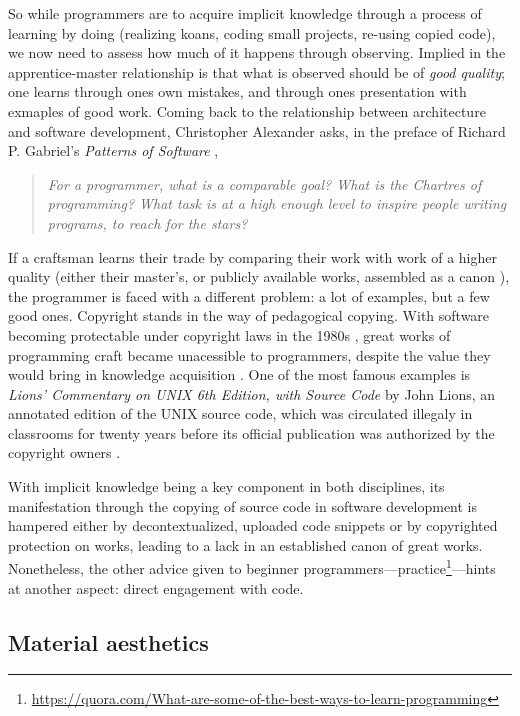So while programmers are to acquire implicit knowledge through a process of learning by doing (realizing koans, coding small projects, re-using copied code), we now need to assess how much of it happens through observing. Implied in the apprentice-master relationship is that what is observed should be of \textit{good quality}; one learns through ones own mistakes, and through ones presentation with exmaples of good work. Coming back to the relationship between architecture and software development, Christopher Alexander asks, in the preface of Richard P. Gabriel's \textit{Patterns of Software} \citep{gabriel_patterns_1998},

\begin{quote}
  \textit{For a programmer, what is a comparable goal? What is the Chartres of programming? What task is at a high enough level to inspire people writing programs, to reach for the stars?}
\end{quote}

If a craftsman learns their trade by comparing their work with work of a higher quality (either their master's, or publicly available works, assembled as a canon \citep{taylor_patterns_2001}), the programmer is faced with a different problem: a lot of examples, but a few good ones.  Copyright stands in the way of pedagogical copying. With software becoming protectable under copyright laws in the 1980s \citep{oman_computer_2018}, great works of programming craft became unacessible to programmers, despite the value they would bring in knowledge acquisition \citep{gabriel_mob_2001}. One of the most famous examples is \emph{Lions' Commentary on UNIX 6th Edition, with Source Code} by John Lions, an annotated edition of the UNIX source code, which was circulated illegaly in classrooms for twenty years before its official publication was authorized by the copyright owners \citep{lions_lions_1996}.

With implicit knowledge being a key component in both disciplines, its manifestation through the copying of source code in software development is hampered either by decontextualized, uploaded code snippets or by copyrighted protection on works, leading to a lack in an established canon of great works. Nonetheless, the other advice given to beginner programmers—practice\footnote{\url{https://quora.com/What-are-some-of-the-best-ways-to-learn-programming}}—hints at another aspect: direct engagement with code.

\subsection{Material aesthetics}
\label{subsec:material-aesthetic}

